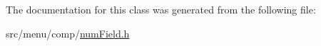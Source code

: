 The documentation for this class was generated from the following file\+:\begin{DoxyCompactItemize}
\item 
src/menu/comp/\hyperlink{numField_8h}{num\+Field.\+h}\end{DoxyCompactItemize}
